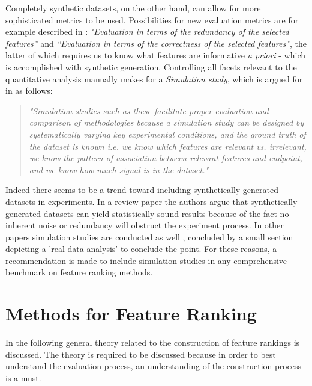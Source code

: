 \documentclass{article}
\begin{document}
Completely synthetic datasets, on the other hand, can allow for more sophisticated metrics to be used. Possibilities for new evaluation metrics are for example described in \citep{solorio-fernandez_review_2020}: \textit{"Evaluation in terms of the redundancy of the selected features”} and \textit{“Evaluation in terms of the correctness of the selected features”}, the latter of which requires us to know what features are informative \textit{a priori} - which is accomplished with synthetic generation. Controlling all facets relevant to the quantitative analysis manually makes for a \textit{Simulation study}, which is argued for in \citep{urbanowicz_benchmarking_2018} as follows:

\begin{quote}
    \textit{"Simulation studies such as these facilitate proper evaluation and comparison of methodologies because a simulation study can be designed by systematically varying key experimental conditions, and the ground truth of the dataset is known i.e. we know which features are relevant vs. irrelevant, we know the pattern of association between relevant features and endpoint, and we know how much signal is in the dataset."}
\end{quote}

Indeed there seems to be a trend toward including synthetically generated datasets in experiments. In a review paper \citep{bolon-canedo_review_2013} the authors argue that synthetically generated datasets can yield statistically sound results because of the fact no inherent noise or redundancy will obstruct the experiment process. In other papers simulation studies are conducted as well \citep{cai_online_2020} \citep{tang_high-dimensional_2020} \citep{li_distributed_2020}, concluded by a small section depicting a 'real data analysis' to conclude the point. For these reasons, a recommendation is made to include simulation studies in any comprehensive benchmark on feature ranking methods.


\section{Methods for Feature Ranking}\label{section:methods for feature ranking}
In the following general theory related to the construction of feature rankings is discussed. The theory is required to be discussed because in order to best understand the evaluation process, an understanding of the construction process is a must.
\end{document}
